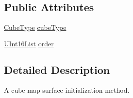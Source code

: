 \subsection*{Public Attributes}
\begin{DoxyCompactItemize}
\item 
\hyperlink{classFCDEffectParameterSurfaceInitCube_a59228097e934d37b9e8ae788a749bc07}{CubeType} \hyperlink{classFCDEffectParameterSurfaceInitCube_af13376d1509627b73843e631db0abffb}{cubeType}
\item 
\hyperlink{classfm_1_1vector}{UInt16List} \hyperlink{classFCDEffectParameterSurfaceInitCube_abb0a85514c43581c62d9b1167d329035}{order}
\end{DoxyCompactItemize}


\subsection{Detailed Description}
A cube-\/map surface initialization method. 

